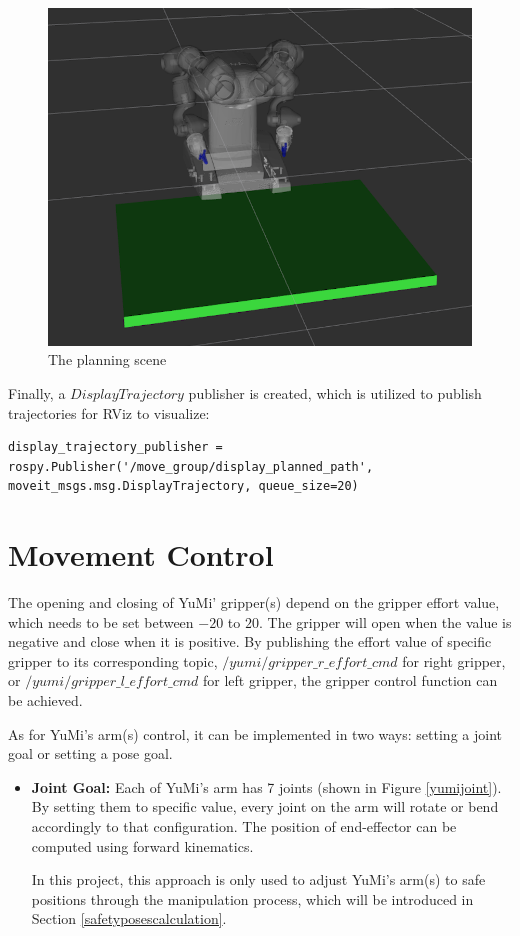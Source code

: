 \begin{figure}[H]
\centering
\includegraphics[width = 0.5\columnwidth]{Implementation/mp/planningscene.png}
\caption{The planning scene}
\label{scene}
\end{figure}

Finally, a $DisplayTrajectory$ publisher is created, which is utilized to publish trajectories for RViz to visualize:

\begin{verbatim}
display_trajectory_publisher = rospy.Publisher('/move_group/display_planned_path', 	moveit_msgs.msg.DisplayTrajectory, queue_size=20)
\end{verbatim}


\section{Movement Control} \label{movementcontrol}
The opening and closing of YuMi' gripper(s) depend on the gripper effort value, which needs to be set between $-20$ to $20$. The gripper will open when the value is negative and close when it is positive. By publishing the effort value of specific gripper to its corresponding topic, $/yumi/gripper\_r\_effort\_cmd$ for right gripper, or $/yumi/gripper\_l\_effort\_cmd$ for left gripper, the gripper control function can be achieved. 


As for YuMi's arm(s) control, it can be implemented in two ways: setting a joint goal or setting a pose goal.

\begin{itemize}
    \item \textbf{Joint Goal:} Each of YuMi's arm has 7 joints (shown in Figure \ref{yumijoint}). By setting them to specific value, every joint on the arm will rotate or bend accordingly to that configuration. The position of end-effector can be computed using forward kinematics.
    
    In this project, this approach is only used to adjust YuMi's arm(s) to safe positions through the manipulation process, which will be introduced in Section \ref{safetyposescalculation}.
\end{itemize}

